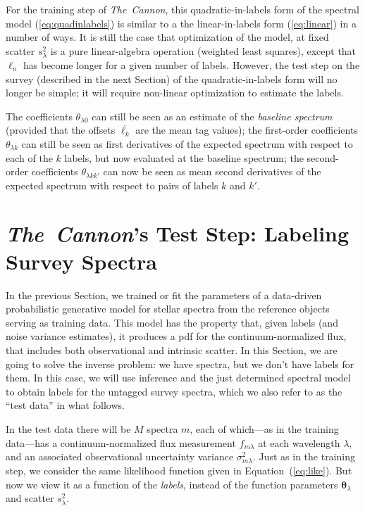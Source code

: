 \documentclass[12pt, preprint]{aastex}
\newcommand{\sectionname}{Section}
\newcommand{\tc}{\textsl{The~Cannon}}
\newcommand{\set}[1]{\bm{#1}}
\newcommand{\starlabel}{\ell}
\newcommand{\starlabelvec}{\set{\starlabel}}
\newcommand{\mean}[1]{\overline{#1}}
\begin{document}
For the training step of \tc , this quadratic-in-labels form of the spectral model (\ref{eq:quadinlabels}) is similar to a the linear-in-labels form (\ref{eq:linear}) in a number
of ways.
It is still the case that optimization of the model, at fixed scatter
$s_\lambda^2$ is a pure linear-algebra operation (weighted least
squares), except that $\starlabelvec_n$ has become longer for a given number of labels. 
However, the test step on the survey (described in the next Section) of the quadratic-in-labels form
 will no longer be simple; it will require non-linear
optimization to estimate the labels.

The coefficients $\theta_{\lambda 0}$ can still be seen as an estimate of the
\emph{baseline spectrum} (provided that the offsets $\mean{\starlabel_k}$ are the
mean tag values); the first-order coefficients $\theta_{\lambda k}$ can still
be seen as first derivatives of the expected spectrum with respect to
each of the $k$ labels, but now evaluated at the baseline spectrum; the
second-order coefficients $\theta_{\lambda kk'}$ can now be seen as mean
second derivatives of the expected spectrum with respect to pairs of
labels $k$ and $k'$.

\section{\tc's Test Step: Labeling Survey Spectra}
\label{sec:paramestimate}

In the previous Section, we trained or fit the parameters of
a data-driven probabilistic generative model for stellar spectra from the reference objects
serving as training data.
This model has the property that, given labels (and noise variance estimates), it produces a
pdf for the continuum-normalized flux, that includes both observational and intrinsic
scatter.
In this \sectionname, we are going to solve the inverse problem:
we have spectra, but we don't have labels for them.
In this case, we will use inference and the just determined spectral model
to obtain labels for the untagged survey
spectra, which we also refer to as the ``test data'' in what follows. 

In the test data there will be $M$ spectra $m$, each of which---as in
the training data---has a continuum-normalized flux measurement
$f_{m\lambda}$ at each wavelength $\lambda$, and an
associated observational uncertainty variance $\sigma_{m\lambda}^2$.
Just as in the training step, we consider the same likelihood function given in
Equation~(\ref{eq:like}). But now we view it as a function of the \emph{labels},
instead of the function parameters $\set{\theta}_\lambda$ and
scatter $s_\lambda^2$.
\end{document}
